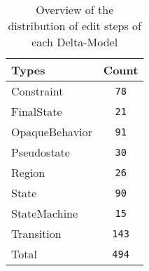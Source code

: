 \begin{table} 
 \center 
 \small 
\begin{tabular}{|l|c|}
\hline
Types & Count\\ 
  \hline 
Constraint & \texttt{78}\\ 
  \hline 
FinalState & \texttt{21}\\ 
  \hline 
OpaqueBehavior & \texttt{91}\\ 
  \hline 
Pseudostate & \texttt{30}\\ 
  \hline 
Region & \texttt{26}\\ 
  \hline 
State & \texttt{90}\\ 
  \hline 
StateMachine & \texttt{15}\\ 
  \hline 
Transition & \texttt{143}\\ 
  \hline 
Total & \texttt{494}\\ 
  \hline 
\end{tabular}
\caption[Overview: Delta-Models]{Overview of the distribution of edit steps of each Delta-Model}
\end{table}

